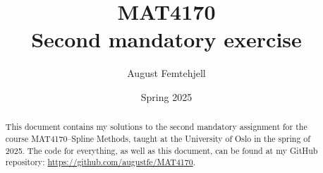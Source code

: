 \documentclass[a4paper,12pt]{article}
\title{
    MAT4170\\
    \small{Second mandatory exercise}
}
\author{August Femtehjell}
\date{Spring 2025}
\theoremstyle{exerciseStyle}
\theoremstyle{solutionStyle}
\numberwithin{equation}{solutionTemp}
\begin{document}
\maketitle

\tableofcontents

\begin{abstract}
    This document contains my solutions to the second mandatory assignment for the course MAT4170--Spline Methods, taught at the University of Oslo in the spring of 2025.
    The code for everything, as well as this document, can be found at my GitHub repository: \url{https://github.com/augustfe/MAT4170}.
\end{abstract}


\end{document}

